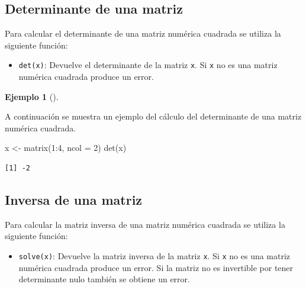\documentclass[
  a4paper,
]{scrreport}
\newenvironment{Shaded}{\begin{snugshade}}{\end{snugshade}}
\newcommand{\AttributeTok}[1]{\textcolor[rgb]{0.40,0.45,0.13}{#1}}
\newcommand{\DecValTok}[1]{\textcolor[rgb]{0.68,0.00,0.00}{#1}}
\newcommand{\FunctionTok}[1]{\textcolor[rgb]{0.28,0.35,0.67}{#1}}
\newcommand{\NormalTok}[1]{\textcolor[rgb]{0.00,0.23,0.31}{#1}}
\newcommand{\OtherTok}[1]{\textcolor[rgb]{0.00,0.23,0.31}{#1}}
\newcommand{\SpecialCharTok}[1]{\textcolor[rgb]{0.37,0.37,0.37}{#1}}
\providecommand{\tightlist}{%
  \setlength{\itemsep}{0pt}\setlength{\parskip}{0pt}}\usepackage{longtable,booktabs,array}
\theoremstyle{definition}
\newtheorem{example}{Ejemplo}[chapter]
\theoremstyle{definition}
\theoremstyle{remark}
\begin{document}
\hypertarget{determinante-de-una-matriz}{%
\subsection{Determinante de una
matriz}\label{determinante-de-una-matriz}}

Para calcular el determinante de una matriz numérica cuadrada se utiliza
la siguiente función:

\begin{itemize}
\tightlist
\item
  \texttt{det(x)}: Devuelve el determinante de la matriz \texttt{x}. Si
  \texttt{x} no es una matriz numérica cuadrada produce un error.
\end{itemize}

\leavevmode{}%
\begin{example}[]\label{exm-determinante}

A continuación se muestra un ejemplo del cálculo del determinante de una
matriz numérica cuadrada.

\begin{Shaded}
\begin{Highlighting}[]
\NormalTok{x }\OtherTok{\textless{}{-}} \FunctionTok{matrix}\NormalTok{(}\DecValTok{1}\SpecialCharTok{:}\DecValTok{4}\NormalTok{, }\AttributeTok{ncol =} \DecValTok{2}\NormalTok{)}
\FunctionTok{det}\NormalTok{(x)}
\end{Highlighting}
\end{Shaded}

\begin{verbatim}
[1] -2
\end{verbatim}

\end{example}

\hypertarget{inversa-de-una-matriz}{%
\subsection{Inversa de una matriz}\label{inversa-de-una-matriz}}

Para calcular la matriz inversa de una matriz numérica cuadrada se
utiliza la siguiente función:

\begin{itemize}
\tightlist
\item
  \texttt{solve(x)}: Devuelve la matriz inversa de la matriz \texttt{x}.
  Si \texttt{x} no es una matriz numérica cuadrada produce un error. Si
  la matriz no es invertible por tener determinante nulo también se
  obtiene un error.
\end{itemize}
\end{document}
